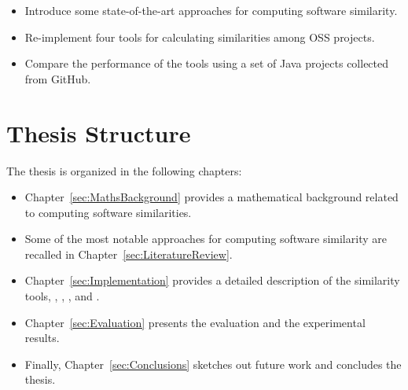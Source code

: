 \begin{itemize}
	\item Introduce some state-of-the-art approaches for computing software similarity.	
	\item Re-implement four tools for calculating similarities among OSS projects.
	\item Compare the performance of the tools using a set of Java projects collected from GitHub. %
\end{itemize}

\section{Thesis Structure}

The thesis is organized in the following chapters:

\begin{itemize}
	\item Chapter~\ref{sec:MathsBackground} provides a mathematical background related to computing software similarities.
	\item Some of the most notable approaches for computing software similarity are recalled in Chapter~\ref{sec:LiteratureReview}.
	\item Chapter~\ref{sec:Implementation} provides a detailed description of the similarity tools, \ie \MUDABlue \cite{10.1109/APSEC.2004.69}, \CLAN \cite{McMillan:2012:DSS:2337223.2337267}, \RepoPal \cite{10.1109/SANER.2017.7884605}, and \CrossSim \cite{NDRDSEAA2018}.
	\item Chapter~\ref{sec:Evaluation} presents the evaluation and the experimental results.
	\item Finally, Chapter~\ref{sec:Conclusions} sketches out future work and concludes the thesis. 
\end{itemize}